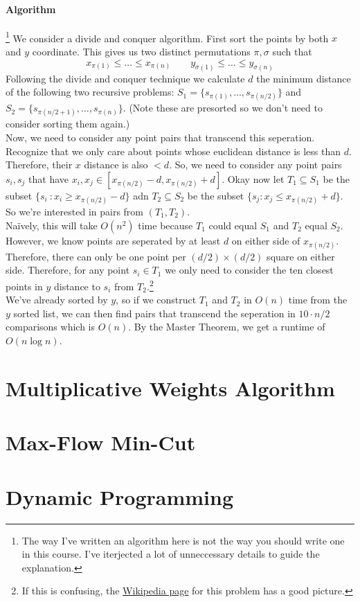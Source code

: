 \documentclass[11pt]{article}
\theoremstyle{plain}
\theoremstyle{definition}
\numberwithin{equation}{section}
\numberwithin{figure}{section}
\begin{document}
\paragraph{Algorithm}\footnote{The way I've written an algorithm here is not the way you should write one in this course. I've iterjected a lot of unneccessary details to guide the explanation.} We consider a divide and conquer algorithm. First sort the points by both $x$ and $y$ coordinate. This gives us two distinct permutations $\pi, \sigma$ such that
\begin{equation}
x_{\pi(1)} \leq \ldots \leq x_{\pi(n)} \qquad y_{\sigma(1)} \leq \ldots \leq y_{\sigma(n)}
\end{equation}
Following the divide and conquer technique we calculate $d$ the minimum distance of the following two recursive problems: $S_1 = \{s_{\pi(1)}, \ldots, s_{\pi(n/2)}\}$ and $S_2 = \{s_{\pi(n/2 + 1)}, \ldots, s_{\pi(n)}\}$. (Note these are presorted so we don't need to consider sorting them again.) \\

\noindent Now, we need to consider any point pairs that transcend this seperation. Recognize that we only care about points whose euclidean distance is less than $d$. Therefore, their $x$ distance is also $< d$. So, we need to consider any point pairs $s_i, s_j$ that have $x_i, x_j \in [x_{\pi(n/2)}-d, x_{\pi(n/2)}+d]$. Okay now let $T_1 \subseteq S_1$ be the subset $\{s_i \ : x_i \geq x_{\pi(n/2)}-d\}$ adn $T_2 \subseteq S_2$ be the subset $\{s_j : x_j \leq x_{\pi(n/2)} + d\}$. So we're interested in pairs from $(T_1, T_2)$. \\

\noindent Na\"ively, this will take $O(n^2)$ time because $T_1$ could equal $S_1$ and $T_2$ equal $S_2$. However, we know points are seperated by at least $d$ on either side of $x_{\pi(n/2)}$. Therefore, there can only be one point per $(d/2) \times (d/2)$ square on either side. Therefore, for any point $s_i \in T_1$ we only need to consider the ten closest points in $y$ distance to $s_i$ from $T_2$.\footnote{If this is confusing, the \href{https://en.wikipedia.org/wiki/Closest_pair_of_points_problem}{Wikipedia page} for this problem has a good picture.} \\

\noindent We've already sorted by $y$, so if we construct $T_1$ and $T_2$ in $O(n)$ time from the $y$ sorted list, we can then find pairs that transcend the seperation in $10 \cdot n/2$ comparisons which is $O(n)$. By the Master Theorem, we get a runtime of $O(n \log n)$.

\newpage
\section{Multiplicative Weights Algorithm}

\newpage
\section{Max-Flow Min-Cut}

\newpage
\section{Dynamic Programming}
\end{document}
